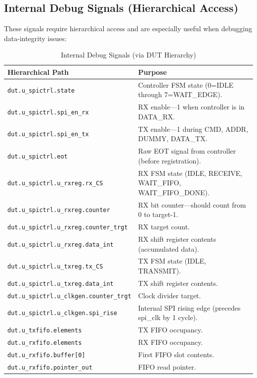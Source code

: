 \subsection{Internal Debug Signals (Hierarchical Access)}

These signals require hierarchical access and are especially useful when debugging
data-integrity issues:

\begin{table}[H]
\centering
\caption{Internal Debug Signals (via DUT Hierarchy)}
\label{tab:debug_signals}
\small
\begin{tabularx}{\textwidth}{@{}lX@{}}
\toprule
\textbf{Hierarchical Path} & \textbf{Purpose} \\
\midrule
\texttt{dut.u\_spictrl.state} & Controller FSM state (0=IDLE through 7=WAIT\_EDGE). \\
\texttt{dut.u\_spictrl.spi\_en\_rx} & RX enable---1 when controller is in DATA\_RX. \\
\texttt{dut.u\_spictrl.spi\_en\_tx} & TX enable---1 during CMD, ADDR, DUMMY, DATA\_TX. \\
\texttt{dut.u\_spictrl.eot} & Raw EOT signal from controller (before registration). \\
\texttt{dut.u\_spictrl.u\_rxreg.rx\_CS} & RX FSM state (IDLE, RECEIVE, WAIT\_FIFO, WAIT\_FIFO\_DONE). \\
\texttt{dut.u\_spictrl.u\_rxreg.counter} & RX bit counter---should count from 0 to target-1. \\
\texttt{dut.u\_spictrl.u\_rxreg.counter\_trgt} & RX target count. \\
\texttt{dut.u\_spictrl.u\_rxreg.data\_int} & RX shift register contents (accumulated data). \\
\texttt{dut.u\_spictrl.u\_txreg.tx\_CS} & TX FSM state (IDLE, TRANSMIT). \\
\texttt{dut.u\_spictrl.u\_txreg.data\_int} & TX shift register contents. \\
\texttt{dut.u\_spictrl.u\_clkgen.counter\_trgt} & Clock divider target. \\
\texttt{dut.u\_spictrl.u\_clkgen.spi\_rise} & Internal SPI rising edge (precedes spi\_clk by 1 cycle). \\
\texttt{dut.u\_txfifo.elements} & TX FIFO occupancy. \\
\texttt{dut.u\_rxfifo.elements} & RX FIFO occupancy. \\
\texttt{dut.u\_rxfifo.buffer[0]} & First FIFO slot contents. \\
\texttt{dut.u\_rxfifo.pointer\_out} & FIFO read pointer. \\
\bottomrule
\end{tabularx}
\end{table}

